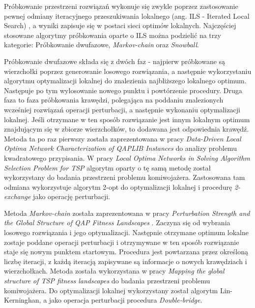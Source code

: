 Próbkowanie przestrzeni rozwiązań wykonuje się zwykle poprzez zastosowanie pewnej odmiany iteracyjnego przeszukiwania lokalnego
(ang. ILS - Iterated Local Search) \cite{DBLP:journals/corr/OchoaVDT14},
a wyniki zapisuje się w postaci sieci optimów lokalnych.
Najczęściej stosowane algorytmy próbkowania oparte o ILS można podzielić na trzy kategorie:
Próbkowanie dwufazowe, \textit{Markov-chain} oraz \textit{Snowball}.

Próbkowanie dwufazowe składa się z dwóch faz - najpierw próbkowane są wierzchołki poprzez  generowanie
losowego rozwiązania, a następnie wykorzystaniu algorytmu optymalizacji lokalnej do znalezienia najbliższego
lokalnego optimum. Następuje po tym wylosowanie nowego punktu i powtórzenie procedury.
Druga faza to faza próbkowania krawędzi, polegająca na poddaniu znalezionych wcześniej rozwiązań operacji perturbacji, a następnie wykonaniu optymalizacji
lokalnej. Jeśli otrzymane w ten sposób rozwiązanie jest innym lokalnym optimum znajdującym się w zbiorze wierzchołków, to dodawana jest odpowiednia krawędź.
Metoda ta po raz pierwszy została zaprezentowana w pracy \textit{Data-Driven Local Optima Network Characterization of QAPLIB Instances} \cite{10.1145/2576768.2598275}
do analizy problemu kwadratowego przypisania.
W pracy \textit{Local Optima Networks in Solving Algorithm Selection Problem for TSP} \cite{DBLP:conf/depcos/BozejkoGNAB18}
algorytm oparty o tę samą metodę został wykorzystany do badania przestrzeni problemu komiwojażera.
Zastosowana tam odmiana wykorzystuje algorytm 2-opt do optymalizacji lokalnej i procedurę \textit{2-exchange} jako operację perturbacji.

Metoda \textit{Markov-chain} została zaprezentowana w pracy \textit{Perturbation Strength and the Global Structure of QAP Fitness Landscapes} \cite{markovchain}.
Zaczyna się od wybrania losowego rozwiązania i jego optymalizacji. Następnie otrzymane optimum lokalne zostaje poddane operacji perturbacji
i otrzymywane w ten sposób rozwiązanie staje się nowym punktem startowym. Procedura jest powtarzana przez określoną liczbę iteracji, z każdą iteracją
zapisywane są informacje o nowych krawędziach i wierzchołkach.
Metoda została wykorzystana w pracy \textit{Mapping the global structure of TSP fitness landscapes} \cite{DBLP:journals/heuristics/OchoaV18} do badania przestrzeni problemu komiwojażera.
Do optymalizacji lokalnej wykorzystany został algorytm Lin-Kerninghan, a jako operacja perturbacji procedura \textit{Double-bridge}.

